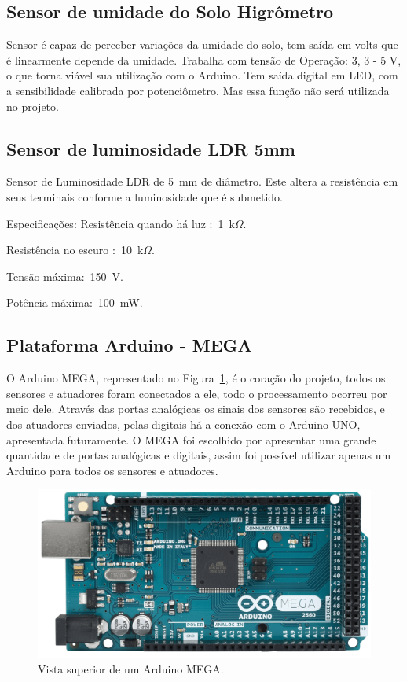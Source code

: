 \documentclass[a4paper,12pt]{report}
\begin{document}
		\subsection{Sensor de umidade do Solo Higrômetro}
		Sensor é capaz de perceber variações da umidade do solo, tem saída em volts que é linearmente depende da umidade.
		Trabalha com tensão de Operação: 3, 3 - 5 V, o que torna viável sua utilização com o Arduino. Tem saída digital em LED, com a sensibilidade calibrada por potenciômetro. Mas essa função não será utilizada no projeto.
	
		\subsection{Sensor de luminosidade LDR 5mm}
		
		Sensor de Luminosidade LDR de 5~mm de diâmetro. Este altera a resistência em seus terminais conforme a luminosidade que é submetido.
		
		Especificações:
		Resistência quando há luz :~1~k$\Omega$.
		
		Resistência no escuro :~10~k$\Omega$.
		
		Tensão máxima:~150~V.
		
		Potência máxima:~100~mW.
		
		\subsection{Plataforma Arduino - MEGA}	
		 
		O Arduino MEGA, representado no Figura~\ref{fig:MEGA}, é o coração do projeto, todos os sensores e atuadores foram conectados a ele, todo o processamento ocorreu por meio dele. Através das portas analógicas os sinais dos sensores são recebidos, e dos atuadores enviados, pelas digitais há a conexão com o Arduino UNO, apresentada futuramente. O MEGA foi escolhido por apresentar uma grande quantidade de portas analógicas e digitais, assim foi possível utilizar apenas um Arduino para todos os sensores e atuadores. 
		
		\begin{figure}[!h]
			\centering
			\includegraphics[width=0.6\linewidth]{figs/ARDUINO_MEGA_A03}
			\caption{Vista superior de um Arduino MEGA.}
			\label{fig:MEGA}
		\end{figure}
		
\end{document}
